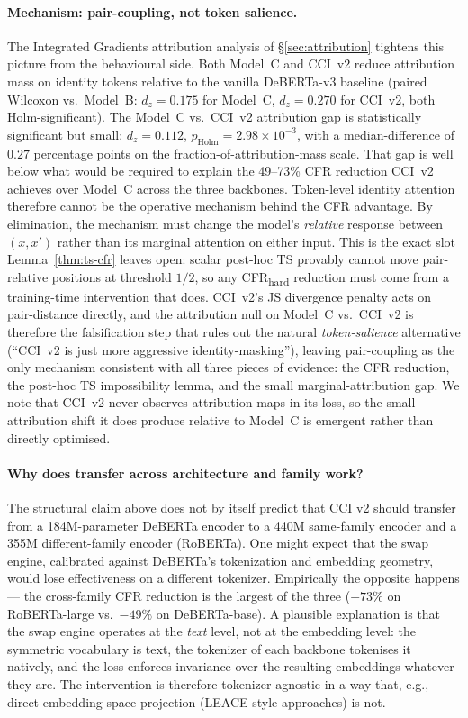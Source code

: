 \documentclass[10pt,a4paper]{article}
\begin{document}
\paragraph{Mechanism: pair-coupling, not token salience.}
The Integrated Gradients attribution analysis of \S\ref{sec:attribution} tightens this picture from the behavioural side. Both Model~C and CCI~v2 reduce attribution mass on identity tokens relative to the vanilla DeBERTa-v3 baseline (paired Wilcoxon vs.\ Model~B: $d_z = 0.175$ for Model~C, $d_z = 0.270$ for CCI~v2, both Holm-significant). The Model~C vs.\ CCI~v2 attribution gap is statistically significant but small: $d_z = 0.112$, $p_{\mathrm{Holm}} = 2.98{\times}10^{-3}$, with a median-difference of $0.27$ percentage points on the fraction-of-attribution-mass scale. That gap is well below what would be required to explain the 49--73\% CFR reduction CCI~v2 achieves over Model~C across the three backbones. Token-level identity attention therefore cannot be the operative mechanism behind the CFR advantage. By elimination, the mechanism must change the model's \emph{relative} response between $(x, x')$ rather than its marginal attention on either input. This is the exact slot Lemma~\ref{thm:ts-cfr} leaves open: scalar post-hoc TS provably cannot move pair-relative positions at threshold $1/2$, so any CFR\textsubscript{hard} reduction must come from a training-time intervention that does. CCI~v2's JS divergence penalty acts on pair-distance directly, and the attribution null on Model~C vs.\ CCI~v2 is therefore the falsification step that rules out the natural \emph{token-salience} alternative (``CCI~v2 is just more aggressive identity-masking''), leaving pair-coupling as the only mechanism consistent with all three pieces of evidence: the CFR reduction, the post-hoc TS impossibility lemma, and the small marginal-attribution gap. We note that CCI~v2 never observes attribution maps in its loss, so the small attribution shift it does produce relative to Model~C is emergent rather than directly optimised.

\paragraph{Why does transfer across architecture and family work?}
The structural claim above does not by itself predict that CCI v2 should transfer from a 184M-parameter DeBERTa encoder to a 440M same-family encoder and a 355M different-family encoder (RoBERTa). One might expect that the swap engine, calibrated against DeBERTa's tokenization and embedding geometry, would lose effectiveness on a different tokenizer. Empirically the opposite happens --- the cross-family CFR reduction is the largest of the three ($-73\%$ on RoBERTa-large vs.\ $-49\%$ on DeBERTa-base). A plausible explanation is that the swap engine operates at the \emph{text} level, not at the embedding level: the symmetric vocabulary is text, the tokenizer of each backbone tokenises it natively, and the loss enforces invariance over the resulting embeddings whatever they are. The intervention is therefore tokenizer-agnostic in a way that, e.g., direct embedding-space projection (LEACE-style approaches) is not.
\end{document}
